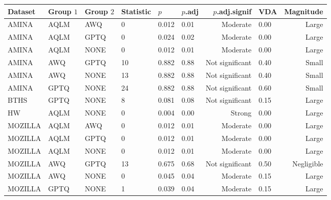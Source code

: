 \begin{table}[ht]
\begin{subtable}[t]{0.47\textwidth}
\begin{tabular}{llllllrlr}
    \toprule
    Dataset & Group $1$ & Group $2$ & Statistic & $p$ & $p$.adj & $p$.adj.signif & VDA & Magnitude \\
    \midrule
    AMINA & AQLM & AWQ & 0 & 0.012 & 0.01 & Moderate & 0.00 & Large \\
    AMINA & AQLM & GPTQ & 0 & 0.024 & 0.02 & Moderate & 0.00 & Large \\
    AMINA & AQLM & NONE & 0 & 0.012 & 0.01 & Moderate & 0.00 & Large \\
    AMINA & AWQ & GPTQ & 10 & 0.882 & 0.88 & Not significant & 0.40 & Small \\
    AMINA & AWQ & NONE & 13 & 0.882 & 0.88 & Not significant & 0.40 & Small \\
    AMINA & GPTQ & NONE & 24 & 0.882 & 0.88 & Not significant & 0.60 & Small \\
    BTHS & GPTQ & NONE & 8 & 0.081 & 0.08 & Not significant & 0.15 & Large \\
    HW & AQLM & NONE & 0 & 0.004 & 0.00 & Strong & 0.00 & Large \\
    MOZILLA & AQLM & AWQ & 0 & 0.012 & 0.01 & Moderate & 0.00 & Large \\
    MOZILLA & AQLM & GPTQ & 0 & 0.012 & 0.01 & Moderate & 0.00 & Large \\
    MOZILLA & AQLM & NONE & 0 & 0.012 & 0.01 & Moderate & 0.00 & Large \\
    MOZILLA & AWQ & GPTQ & 13 & 0.675 & 0.68 & Not significant & 0.50 & Negligible \\
    MOZILLA & AWQ & NONE & 0 & 0.045 & 0.04 & Moderate & 0.15 & Large \\
    MOZILLA & GPTQ & NONE & 1 & 0.039 & 0.04 & Moderate & 0.15 & Large \\
    \bottomrule
    \end{tabular}
\end{subtable}

\vspace{1em}


\end{table}
